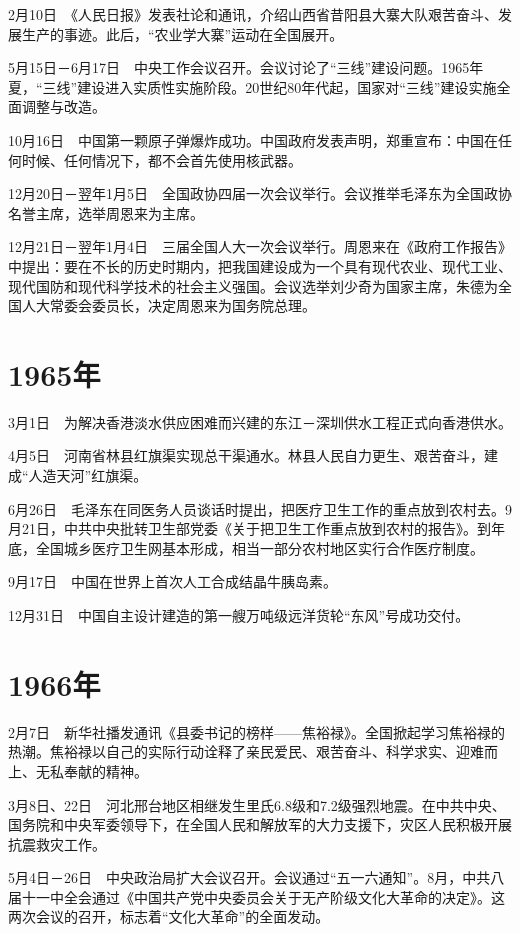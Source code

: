 \documentclass[10pt,a4paper,twocolumn]{book}
\begin{document}
2月10日　《人民日报》发表社论和通讯，介绍山西省昔阳县大寨大队艰苦奋斗、发展生产的事迹。此后，“农业学大寨”运动在全国展开。

5月15日－6月17日　中央工作会议召开。会议讨论了“三线”建设问题。1965年夏，“三线”建设进入实质性实施阶段。20世纪80年代起，国家对“三线”建设实施全面调整与改造。

10月16日　中国第一颗原子弹爆炸成功。中国政府发表声明，郑重宣布：中国在任何时候、任何情况下，都不会首先使用核武器。

12月20日－翌年1月5日　全国政协四届一次会议举行。会议推举毛泽东为全国政协名誉主席，选举周恩来为主席。

12月21日－翌年1月4日　三届全国人大一次会议举行。周恩来在《政府工作报告》中提出：要在不长的历史时期内，把我国建设成为一个具有现代农业、现代工业、现代国防和现代科学技术的社会主义强国。会议选举刘少奇为国家主席，朱德为全国人大常委会委员长，决定周恩来为国务院总理。

\section{1965年}

3月1日　为解决香港淡水供应困难而兴建的东江－深圳供水工程正式向香港供水。

4月5日　河南省林县红旗渠实现总干渠通水。林县人民自力更生、艰苦奋斗，建成“人造天河”红旗渠。

6月26日　毛泽东在同医务人员谈话时提出，把医疗卫生工作的重点放到农村去。9月21日，中共中央批转卫生部党委《关于把卫生工作重点放到农村的报告》。到年底，全国城乡医疗卫生网基本形成，相当一部分农村地区实行合作医疗制度。

9月17日　中国在世界上首次人工合成结晶牛胰岛素。

12月31日　中国自主设计建造的第一艘万吨级远洋货轮“东风”号成功交付。

\section{1966年}

2月7日　新华社播发通讯《县委书记的榜样——焦裕禄》。全国掀起学习焦裕禄的热潮。焦裕禄以自己的实际行动诠释了亲民爱民、艰苦奋斗、科学求实、迎难而上、无私奉献的精神。

3月8日、22日　河北邢台地区相继发生里氏6.8级和7.2级强烈地震。在中共中央、国务院和中央军委领导下，在全国人民和解放军的大力支援下，灾区人民积极开展抗震救灾工作。

5月4日－26日　中央政治局扩大会议召开。会议通过“五一六通知”。8月，中共八届十一中全会通过《中国共产党中央委员会关于无产阶级文化大革命的决定》。这两次会议的召开，标志着“文化大革命”的全面发动。
\end{document}
